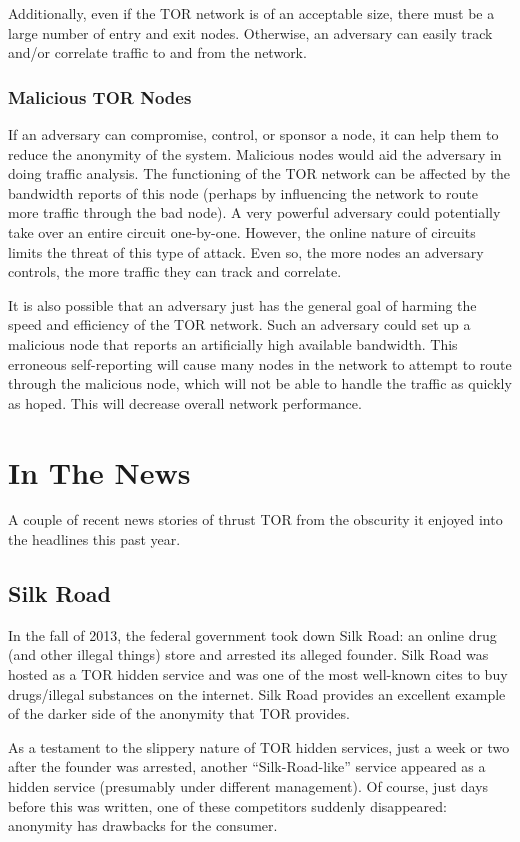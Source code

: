 \documentclass[letterpaper, titlepage, 12pt]{article}
\begin{document}
Additionally, even if the TOR network is of an acceptable size, there must be a large number of entry and exit nodes. Otherwise, an adversary can easily track and/or correlate traffic to and from the network.

\subsubsection{Malicious TOR Nodes}
If an adversary can compromise, control, or sponsor a node, it can help them to reduce the anonymity of the system. Malicious nodes would aid the adversary in doing traffic analysis. The functioning of the TOR network can be affected by the bandwidth reports of this node (perhaps by influencing the network to route more traffic through the bad node). A very powerful adversary could potentially take over an entire circuit one-by-one\cite{whitepaper}. However, the online nature of circuits limits the threat of this type of attack. Even so, the more nodes an adversary controls, the more traffic they can track and correlate.

It is also possible that an adversary just has the general goal of harming the speed and efficiency of the TOR network. Such an adversary could set up a malicious node that reports an artificially high available bandwidth\cite{5560675}. This erroneous self-reporting will cause many nodes in the network to attempt to route through the malicious node, which will not be able to handle the traffic as quickly as hoped. This will decrease overall network performance.

\section{In The News}
A couple of recent news stories of thrust TOR from the obscurity it enjoyed into the headlines this past year. 

\subsection{Silk Road}
In the fall of 2013, the federal government took down Silk Road: an online drug (and other illegal things) store\cite{reuters} and arrested its alleged founder. Silk Road was hosted as a TOR hidden service and was one of the most well-known cites to buy drugs/illegal substances on the internet. Silk Road provides an excellent example of the darker side of the anonymity that TOR provides.

As a testament to the slippery nature of TOR hidden services, just a week or two after the founder was arrested, another ``Silk-Road-like'' service appeared as a hidden service (presumably under different management)\cite{silkroad2}. Of course, just days before this was written, one of these competitors suddenly disappeared\cite{shutdown}: anonymity has drawbacks for the consumer.
\end{document}
